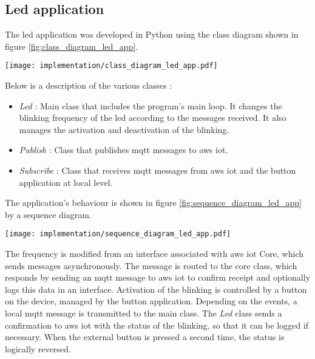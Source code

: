 \subsection{Led application}
The led application was developed in Python using the class diagram shown in figure \ref{fig:class_diagram_led_app}.
\begin{center}
    \begingroup
    \texttt{[image: implementation/class\_diagram\_led\_app.pdf]}
    \label{fig:class_diagram_led_app}
    \endgroup
\end{center}
Below is a description of the various classes :
\begin{itemize}
    \item \textit{Led} : Main class that includes the program's main loop. It changes the blinking frequency of the led according to the messages received. It also manages the activation and deactivation of the blinking.
    \item \textit{Publish} : Class that publishes \acrshort{mqtt} messages to \gls{aws} \acrshort{iot}.
    \item \textit{Subscribe} : Class that receives \acrshort{mqtt} messages from \gls{aws} \acrshort{iot} and the button application at local level.
\end{itemize}
The application's behaviour is shown in figure \ref{fig:sequence_diagram_led_app} by a sequence diagram.
\begin{center}
    \begingroup
    \texttt{[image: implementation/sequence\_diagram\_led\_app.pdf]}
    \label{fig:sequence_diagram_led_app}
    \endgroup
\end{center}
The frequency is modified from an interface associated with \gls{aws} \acrshort{iot} Core, which sends messages asynchronously. The message is routed to the core class, which responds by sending an \acrshort{mqtt} message to \gls{aws} \acrshort{iot} to confirm receipt and optionally logs this data in an interface. Activation of the blinking is controlled by a button on the device, managed by the button application. Depending on the events, a local \acrshort{mqtt} message is transmitted to the main class. The \textit{Led} class sends a confirmation to \gls{aws} \acrshort{iot} with the status of the blinking, so that it can be logged if necessary. When the external button is pressed a second time, the status is logically reversed.

